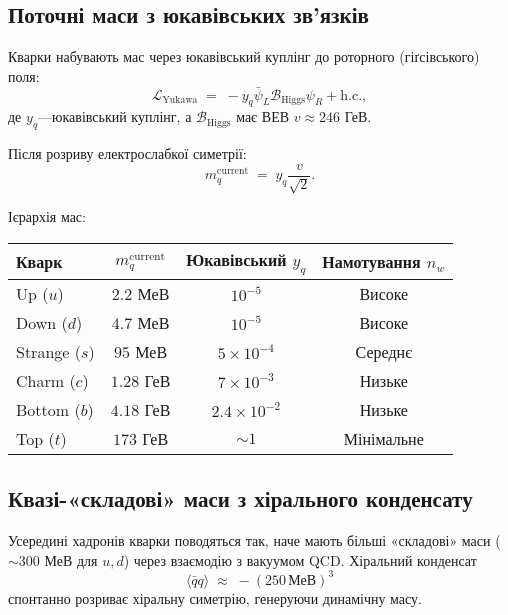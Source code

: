 \documentclass[11pt,a4paper]{article}
\newcommand{\Biv}{\mathcal{B}}
\newcommand{\Lag}{\mathcal{L}}
\theoremstyle{definition}
\theoremstyle{plain}
\theoremstyle{remark}
\begin{document}
\subsection{Поточні маси з юкавівських зв’язків}

Кварки набувають мас через юкавівський куплінг до роторного (гіґсівського) поля:
\begin{equation}
\Lag_{\mathrm{Yukawa}} \;=\; -y_q \bar{\psi}_L \Biv_{\mathrm{Higgs}} \psi_R + \text{h.c.},
\label{eq:quark-yukawa}
\end{equation}
де $y_q$—юкавівський куплінг, а $\Biv_{\mathrm{Higgs}}$ має ВЕВ $v\approx 246$ ГеВ.

Після розриву електрослабкої симетрії:
\begin{equation}
m_q^{\mathrm{current}} \;=\; y_q \frac{v}{\sqrt{2}}.
\label{eq:current-mass}
\end{equation}

Ієрархія мас:
\begin{center}
\begin{tabular}{lccc}
\toprule
Кварк & $m_q^{\mathrm{current}}$ & Юкавівський $y_q$ & Намотування $n_w$ \\
\midrule
Up ($u$)     & $2{.}2$ МеВ   & $10^{-5}$ & Високе \\
Down ($d$)   & $4{.}7$ МеВ   & $10^{-5}$ & Високе \\
Strange ($s$)& $95$ МеВ      & $5\times 10^{-4}$ & Середнє \\
Charm ($c$)  & $1{.}28$ ГеВ  & $7\times 10^{-3}$ & Низьке \\
Bottom ($b$) & $4{.}18$ ГеВ  & $2{.}4\times 10^{-2}$ & Низьке \\
Top ($t$)    & $173$ ГеВ     & $\sim 1$ & Мінімальне \\
\bottomrule
\end{tabular}
\end{center}

\subsection{Квазі-«складові» маси з хірального конденсату}

Усередині хадронів кварки поводяться так, наче мають більші «складові» маси ($\sim 300$ МеВ для $u,d$) через взаємодію з вакуумом QCD. Хіральний конденсат
\begin{equation}
\langle \bar{q}q \rangle \;\approx\; -(250\,\text{МеВ})^3
\end{equation}
спонтанно розриває хіральну симетрію, генеруючи динамічну масу.
\end{document}
